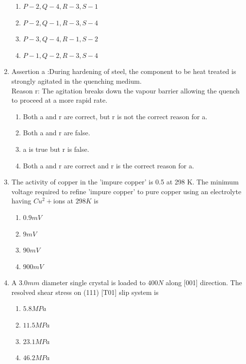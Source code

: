 \documentclass[journal]{IEEEtran}
\theoremstyle{remark}
\begin{document}
\begin{enumerate}
\begin{center}
\begin{tabular}{c c}
\end{tabular}
\end{center}
\begin{multicols}{2}
\begin{enumerate}
    \item $P-2, Q-4, R-3, S-1$
    \item $P-2, Q-1, R-3, S-4$
    \item $P-3, Q-4, R-1, S-2$
    \item $P-1, Q-2, R-3, S-4$
\end{enumerate}
\end{multicols}
\item Assertion a :During hardening of steel, the component to be heat treated is strongly agitated in the quenching medium.\\
Reason r: The agitation breaks down the vapour barrier allowing the quench to proceed at a more rapid rate.
\hfill{}
\begin{enumerate}
    \item Both a and r are correct, but r is not the correct reason for a.
    \item Both a and r are false.
    \item a is true but r is false.
    \item Both a and r are correct and r is the correct reason for a.
\end{enumerate}



\item The activity of copper in the 'impure copper' is 0.5 at 298 K. The minimum voltage required to refine
'impure copper' to pure copper using an electrolyte having $Cu^2+$ions at $298 K$ is\hfill{}
\begin{multicols}{4}
\begin{enumerate}
\item $0.9 mV$
\item $9 mV$
\item  $90 mV$
\item  $900 mV$
\end{enumerate}
\end{multicols}

\item  A $3.0 mm$ diameter single crystal is loaded to $400 N$ along [001] direction. The resolved shear stress on
(111) [T01] slip system is
\hfill{}
\begin{multicols}{4}
\begin{enumerate}
\item  $5.8 MPa$
\item  $11.5 MPa$
\item  $23.1 MPa$
\item $46.2 MPa$
\end{enumerate}
\end{multicols}


\end{enumerate}
\end{document}
